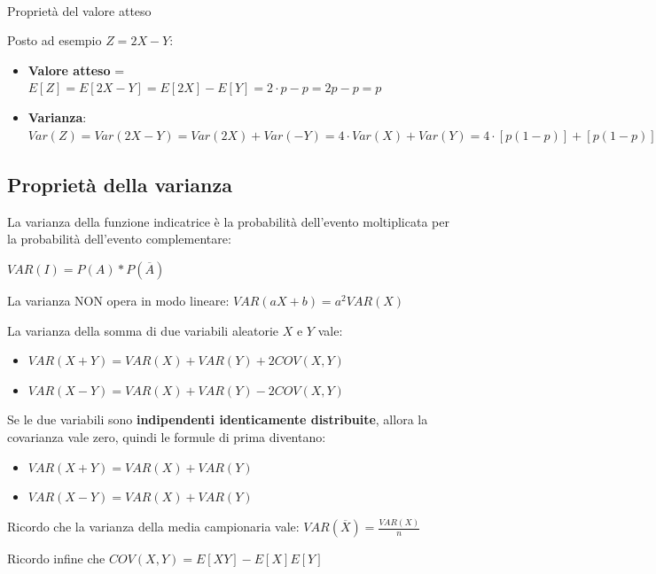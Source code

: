 \documentclass{article}
\begin{document}
\paragraph{}{Proprietà del valore atteso}

Posto ad esempio $Z = 2X - Y$:

\begin{itemize}
    \item \textbf{Valore atteso} = $E[Z] = E[2X - Y] = E[2X] - E[Y] = 2 \cdot p - p = 2p - p = p$
    \item \textbf{Varianza}:  $Var(Z) = Var(2X - Y) = Var(2X) + Var(-Y) = 4 \cdot Var(X) + Var(Y) = 4 \cdot [p(1-p)] + [p(1-p)] = 4 \cdot (p - p^2) + [p - p^2] = 4p - 4p^2 + p - p^2 = -5p^2 + 5p = 5p(1 - p)$
\end{itemize}

\subsection*{Proprietà della varianza}

La varianza della funzione indicatrice è la probabilità dell'evento moltiplicata per la probabilità dell'evento complementare:

$VAR(I) = P(A) * P(\overline{A})$

La varianza NON opera in modo lineare: $VAR(aX + b) = a^2 VAR(X)$

La varianza della somma di due variabili aleatorie $X$ e $Y$ vale:

\begin{itemize}
    \item $VAR(X + Y) = VAR(X) + VAR(Y) + 2COV(X,Y)$
    \item $VAR(X - Y) = VAR(X) + VAR(Y) - 2COV(X,Y)$
\end{itemize}

Se le due variabili sono \textbf{indipendenti identicamente distribuite}, allora la covarianza vale zero, quindi le formule di prima diventano:

\begin{itemize}
    \item $VAR(X + Y) = VAR(X) + VAR(Y)$
    \item $VAR(X - Y) = VAR(X) + VAR(Y)$
\end{itemize}

Ricordo che la varianza della media campionaria vale: $VAR(\overline{X}) = \frac{VAR(X)}{n}$

Ricordo infine che $COV(X, Y) = E[XY] - E[X]E[Y]$
\end{document}
